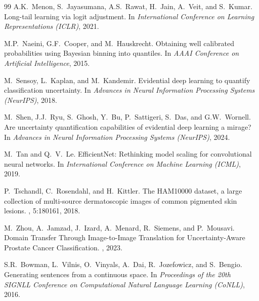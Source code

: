 \documentclass[letterpaper]{article} %
\begin{document}
\begin{thebibliography}{99}
A.K.~Menon, S.~Jayasumana, A.S.~Rawat, H.~Jain, A.~Veit, and S.~Kumar.
\newblock Long-tail learning via logit adjustment.
\newblock In {\em International Conference on Learning Representations (ICLR)}, 2021.

M.P.~Naeini, G.F.~Cooper, and M.~Hauskrecht.
\newblock Obtaining well calibrated probabilities using Bayesian binning into quantiles.
\newblock In {\em AAAI Conference on Artificial Intelligence}, 2015.

M.~Sensoy, L.~Kaplan, and M.~Kandemir.
\newblock Evidential deep learning to quantify classification uncertainty.
\newblock In {\em Advances in Neural Information Processing Systems (NeurIPS)}, 2018.

M.~Shen, J.J.~Ryu, S.~Ghosh, Y.~Bu, P.~Sattigeri, S.~Das, and G.W.~Wornell.
\newblock Are uncertainty quantification capabilities of evidential deep learning a mirage?
\newblock In {\em Advances in Neural Information Processing Systems (NeurIPS)}, 2024.

M.~Tan and Q.~V.~Le.
\newblock EfficientNet: Rethinking model scaling for convolutional neural networks.
\newblock In {\em International Conference on Machine Learning (ICML)}, 2019.

P.~Tschandl, C.~Rosendahl, and H.~Kittler.
\newblock The {HAM10000} dataset, a large collection of multi-source dermatoscopic images of common pigmented skin lesions.
, 5:180161, 2018.

M.~Zhou, A.~Jamzad, J.~Izard, A.~Menard, R.~Siemens, and P.~Mousavi.
\newblock Domain Transfer Through Image-to-Image Translation for Uncertainty-Aware Prostate Cancer Classification.
, 2023.

S.R.~Bowman, L.~Vilnis, O.~Vinyals, A.~Dai, R.~Jozefowicz, and S.~Bengio.
\newblock Generating sentences from a continuous space.
\newblock In {\em Proceedings of the 20th SIGNLL Conference on Computational Natural Language Learning (CoNLL)}, 2016.


\end{thebibliography}
\end{document}
